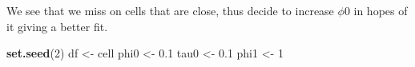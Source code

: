 \documentclass[
]{article}
\newenvironment{Shaded}{\begin{snugshade}}{\end{snugshade}}
\newcommand{\DecValTok}[1]{\textcolor[rgb]{0.00,0.00,0.81}{#1}}
\newcommand{\FloatTok}[1]{\textcolor[rgb]{0.00,0.00,0.81}{#1}}
\newcommand{\KeywordTok}[1]{\textcolor[rgb]{0.13,0.29,0.53}{\textbf{#1}}}
\newcommand{\NormalTok}[1]{#1}
\newcommand{\StringTok}[1]{\textcolor[rgb]{0.31,0.60,0.02}{#1}}
\begin{document}
We see that we miss on cells that are close, thus decide to increase
\(\phi0\) in hopes of it giving a better fit.

\begin{Shaded}
\begin{Highlighting}[]
\KeywordTok{set.seed}\NormalTok{(}\DecValTok{2}\NormalTok{)}
\NormalTok{df <-}\StringTok{ }\NormalTok{cell}
\NormalTok{phi0 <-}\StringTok{ }\FloatTok{0.1}
\NormalTok{tau0 <-}\StringTok{ }\FloatTok{0.1} 
\NormalTok{phi1 <-}\StringTok{ }\DecValTok{1} 
\end{Highlighting}
\end{Shaded}
\end{document}
